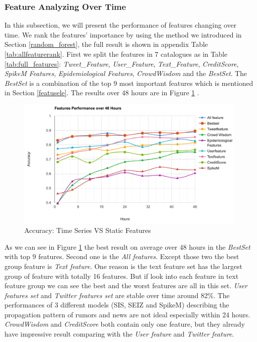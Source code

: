  
  \newpage
 \subsubsection{Feature Analyzing Over Time} 
 \label{featureanalyzing}
 In this subsection, we will present the performance of features changing over time. We rank the features' importance by using the method we introduced in Section \ref{random_forest}, the full result is shown in appendix Table \ref{tab:allfeaturerank}. First we split the features in 7 catalogues as in Table \ref{tab:full_features}: \emph{Tweet\_Feature}, \emph{User\_Feature}, \emph{Text\_Feature},  \emph{CreditScore}, \emph{SpikeM Features}, \emph{Epidemiological Features}, \emph{CrowdWisdom} and the \emph{BestSet}. The \emph{BestSet} is a combination of the top 9 most important features which is mentioned in Section \ref{featusele}. The results over 48 hours are in Figure \ref{fig:allfeature} .
 

 \begin{figure}[!h]
\centering
\includegraphics[width=\columnwidth]{images/allfeatures.png}
\caption{Accuracy: Time Series VS Static Features}
\label{fig:allfeature}
\end{figure}
 
 As we can see in Figure \ref{fig:allfeature} the best result on average over 48 hours in the \emph{BestSet} with top 9 features. Second one is the \emph{All features}. Except those two the best group feature is \emph{Text feature}. One reason is the text feature set has the largest group of feature with totally 16 features. But if look into each feature in text feature group we can see the best and the worst features are all in this set. \emph{User features set} and \emph{Twitter features set} are stable over time around 82\%. The performances of 3 different models (SIS, SEIZ and SpikeM) describing the propagation pattern of rumors and news are not ideal especially within 24 hours. \emph{CrowdWisdom} and \emph{CreditScore} both contain only one feature, but they already have impressive result comparing with the \emph{User feature} and \emph{Twitter feature}.
